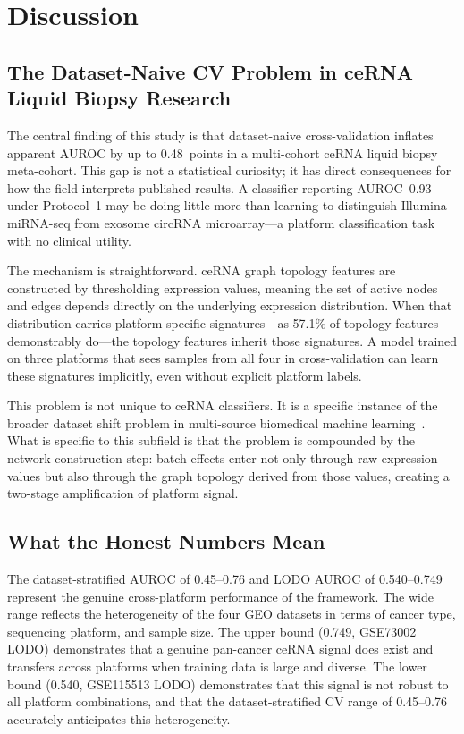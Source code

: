 \documentclass[12pt]{article}
\begin{document}
\section{Discussion}

\subsection{The Dataset-Naive CV Problem in ceRNA Liquid Biopsy Research}

The central finding of this study is that dataset-naive cross-validation
inflates apparent AUROC by up to 0.48~points in a multi-cohort ceRNA
liquid biopsy meta-cohort. This gap is not a statistical curiosity; it
has direct consequences for how the field interprets published results.
A classifier reporting AUROC~0.93 under Protocol~1 may be doing little
more than learning to distinguish Illumina miRNA-seq from exosome
circRNA microarray---a platform classification task with no clinical
utility.

The mechanism is straightforward. ceRNA graph topology features are
constructed by thresholding expression values, meaning the set of
active nodes and edges depends directly on the underlying expression
distribution. When that distribution carries platform-specific
signatures---as 57.1\% of topology features demonstrably do---the
topology features inherit those signatures. A model trained on three
platforms that sees samples from all four in cross-validation can
learn these signatures implicitly, even without explicit platform
labels.

This problem is not unique to ceRNA classifiers. It is a specific
instance of the broader dataset shift problem in multi-source
biomedical machine learning~\citep{leek2010}. What is specific to this
subfield is that the problem is compounded by the network construction
step: batch effects enter not only through raw expression values but
also through the graph topology derived from those values, creating a
two-stage amplification of platform signal.

\subsection{What the Honest Numbers Mean}

The dataset-stratified AUROC of 0.45--0.76 and LODO AUROC of 0.540--0.749
represent the genuine cross-platform performance of the framework.
The wide range reflects the heterogeneity of the four GEO datasets in
terms of cancer type, sequencing platform, and sample size. The upper
bound (0.749, GSE73002 LODO) demonstrates that a genuine pan-cancer
ceRNA signal does exist and transfers across platforms when training data
is large and diverse. The lower bound (0.540, GSE115513 LODO) demonstrates
that this signal is not robust to all platform combinations, and that
the dataset-stratified CV range of 0.45--0.76 accurately anticipates
this heterogeneity.
\end{document}
